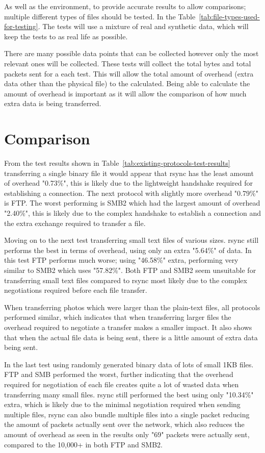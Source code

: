 As well as the environment, to provide accurate results to allow comparisons; multiple different types of files should be tested. In the Table~\ref{tab:file-types-used-for-testing}. The tests will use a mixture of real and synthetic data, which will keep the tests to as real life as possible.

There are many possible data points that can be collected however only the most relevant ones will be collected. These tests will collect the total bytes and total packets sent for a each test. This will allow the total amount of overhead (extra data other than the physical file) to the calculated. Being able to calculate the amount of overhead is important as it will allow the comparison of how much extra data is being transferred.


\section{Comparison}
From the test results shown in Table~\ref{tab:existing-protocols-test-results} transferring a single binary file it would appear that rsync has the least amount of overhead "0.73\%", this is likely due to the lightweight handshake required for establishing a connection. The next protocol with slightly more overhead "0.79\%" is FTP. The worst performing is SMB2 which had the largest amount of overhead "2.40\%", this is likely due to the complex handshake to establish a connection and the extra exchange required to transfer a file.

Moving on to the next test transferring small text files of various sizes. rsync still performs the best in terms of overhead, using only an extra "5.64\%" of data. In this test FTP performs much worse; using "46.58\%" extra, performing very similar to SMB2 which uses "57.82\%". Both FTP and SMB2 seem unsuitable for transferring small text files compared to rsync most likely due to the complex negotiations required before each file transfer.

When transferring photos which were larger than the plain-text files, all protocols performed similar, which indicates that when transferring larger files the overhead required to negotiate a transfer makes a smaller impact. It also shows that when the actual file data is being sent, there is a little amount of extra data being sent.

In the last test using randomly generated binary data of lots of small 1KB files. FTP and SMB performed the worst, further indicating that the overhead required for negotiation of each file creates quite a lot of wasted data when transferring many small files. rsync still performed the best using only "10.34\%" extra, which is likely due to the minimal negotiation required when sending multiple files, rsync can also bundle multiple files into a single packet reducing the amount of packets actually sent over the network, which also reduces the amount of overhead as seen in the results only "69" packets were actually sent, compared to the 10,000+ in both FTP and SMB2.

